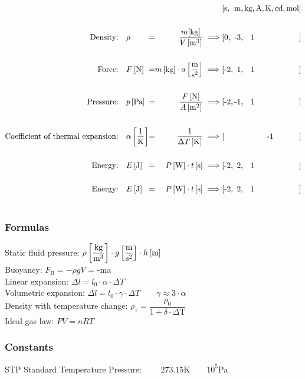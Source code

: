 $$
%
\begin{alignedat}{12}
&&&&&&\llist{s,}{m,}{kg,}{A,}{K,}{cd,}{mol} \\
%
\unit{Density}
  {\rho}
  {\dfrac{m\text{[kg]}}{V\in{\pow{m}{3}}}}
  {\llist{0,}{-3,}{1}{}{}{}{}}
%
\unit{Force}
  {F\in{\text{N}}}
  {m\in{\text{kg}}\cdot a\in{\dfrac{\text{m}}{\pow{s}{2}}}}
  {\llist{-2,}{1,}{1}{}{}{}{}}
%
%
\unit{Pressure}
  {p\in{\text{Pa}}}
  {\dfrac{F\in{\text{N}}}{A\in{\pow{m}{2}}}}
  {\llist{-2,}{-1,}{1}{}{}{}{}}
%
\unit{Coefficient of thermal expansion}
  {\alpha\in{\dfrac{1}{\text{K}}}}
  {\dfrac{1}{\Delta T\in{\text{K}}}}
  {\llist{}{}{}{}{-1}{}{}}
%
\unit{Energy}
  {E\in{\text{J}}}
  {P\in{\text{W}} \cdot t\in{\text{s}}}
  {\llist{-2,}{2,}{1}{}{}{}{}}
%
%
\unit{Energy}
  {E\in{\text{J}}}
  {P\in{\text{W}} \cdot t\in{\text{s}}}
  {\llist{-2,}{2,}{1}{}{}{}{}}
%
\end{alignedat}
%
$$

\subsubsection{Formulas}

Static fluid pressure: $
    \rho\left[\dfrac{\text{kg}}{\text{m}^\text{3}}\right]\cdot 
    g\left[\dfrac{\text{m}}{\text{s}^\text{2}}\right]\cdot
    h\left[\text{m}\right]$
\\
Buoyancy: $F_\text{B} = -\rho gV$ = -ma
\\
Linear expansion: $\Delta l = l_0 \cdot \alpha \cdot \Delta T$
\\
Volumetric expansion: $\Delta l = l_0 \cdot \gamma \cdot \Delta T \qquad \gamma \approx 3\cdot\alpha$
\\
Density with temperature change: $\rho_1 = \dfrac{\rho_0}{1+\delta\cdot\Delta\text{T}}$
\\
Ideal gas law: $PV = nRT$
\subsubsection{Constants}

STP Standard Temperature Pressure: $\qquad 273.15\text{K} \qquad 10^5\text{Pa}$ 


